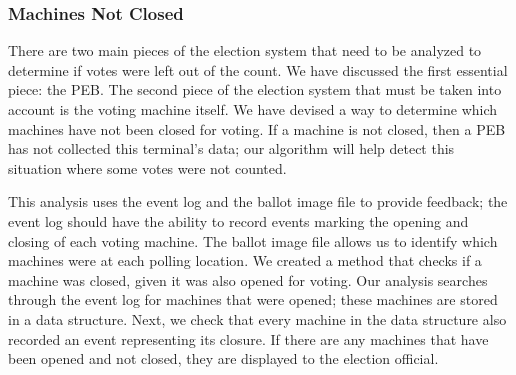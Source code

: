 \subsubsection{Machines Not Closed}
There are two main pieces of the election system that need to be analyzed to determine if votes were left out of the count.  We have discussed the first essential piece: the PEB.  The second piece of the election system that must be taken into account is the voting machine itself.   We have devised a way to determine which machines have not been closed for voting.  If a machine is not closed, then a PEB has not collected this terminal's data; our algorithm will help detect this situation where some votes were not counted.  

This analysis uses the event log and the ballot image file to provide feedback; the event log should have the ability to record events marking the opening and closing of each voting machine.  The ballot image file allows us to identify which machines were at each polling location.  We created a method that checks if a machine was closed, given it was also opened for voting.  Our analysis searches through the event log for machines that were opened; these machines are stored in a data structure.  Next, we check that every machine in the data structure also recorded an event representing its closure.  If there are any machines that have been opened and not closed, they are displayed to the election official.   
